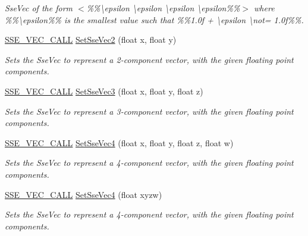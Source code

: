 \begin{DoxyCompactItemize}
\begin{DoxyCompactList}\small\item\em Sse\+Vec of the form $<$\%\%\textbackslash{}epsilon \textbackslash{}epsilon \textbackslash{}epsilon \textbackslash{}epsilon\%\%$>$ where \%\%\textbackslash{}epsilon\%\% is the smallest value such that \%\%1.\+0f + \textbackslash{}epsilon \textbackslash{}not= 1.\+0f\%\%. \end{DoxyCompactList}\item 
\hyperlink{ssevec__math__defs_8h_a97454f977a5281455cecacce1e8ba670}{S\+S\+E\+\_\+\+V\+E\+C\+\_\+\+C\+A\+L\+L} \hyperlink{namespacegofxmath_acfe1470c8903c33f2301785881213d6b}{Set\+Sse\+Vec2} (float x, float y)
\begin{DoxyCompactList}\small\item\em Sets the Sse\+Vec to represent a 2-\/component vector, with the given floating point components. \end{DoxyCompactList}\item 
\hyperlink{ssevec__math__defs_8h_a97454f977a5281455cecacce1e8ba670}{S\+S\+E\+\_\+\+V\+E\+C\+\_\+\+C\+A\+L\+L} \hyperlink{namespacegofxmath_a9470bf18fa113d0d4696f64bdd17de52}{Set\+Sse\+Vec3} (float x, float y, float z)
\begin{DoxyCompactList}\small\item\em Sets the Sse\+Vec to represent a 3-\/component vector, with the given floating point components. \end{DoxyCompactList}\item 
\hyperlink{ssevec__math__defs_8h_a97454f977a5281455cecacce1e8ba670}{S\+S\+E\+\_\+\+V\+E\+C\+\_\+\+C\+A\+L\+L} \hyperlink{namespacegofxmath_a5c69ea49b97ced58947fec384517442d}{Set\+Sse\+Vec4} (float x, float y, float z, float w)
\begin{DoxyCompactList}\small\item\em Sets the Sse\+Vec to represent a 4-\/component vector, with the given floating point components. \end{DoxyCompactList}\item 
\hyperlink{ssevec__math__defs_8h_a97454f977a5281455cecacce1e8ba670}{S\+S\+E\+\_\+\+V\+E\+C\+\_\+\+C\+A\+L\+L} \hyperlink{namespacegofxmath_a4384f47a58c716aecdb418fe2af93c12}{Set\+Sse\+Vec4} (float xyzw)
\begin{DoxyCompactList}\small\item\em Sets the Sse\+Vec to represent a 4-\/component vector, with the given floating point components. \end{DoxyCompactList}\item 

\end{DoxyCompactItemize}
